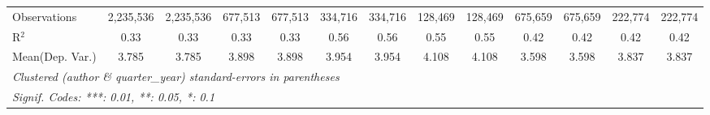 \begin{tabular}{lcccccccccccc}
   Observations                             & 2,235,536    & 2,235,536   & 677,513       & 677,513     & 334,716 & 334,716 & 128,469 & 128,469       & 675,659       & 675,659     & 222,774       & 222,774\\  
   R$^2$                                    & 0.33         & 0.33        & 0.33          & 0.33        & 0.56    & 0.56    & 0.55    & 0.55          & 0.42          & 0.42        & 0.42          & 0.42\\  
Mean(Dep. Var.) & 3.785 & 3.785 & 3.898 & 3.898 & 3.954 & 3.954 & 4.108 & 4.108 & 3.598 & 3.598 & 3.837 & 3.837 \\
   \midrule \midrule
   \multicolumn{13}{l}{\emph{Clustered (author \& quarter\_year) standard-errors in parentheses}}\\
   \multicolumn{13}{l}{\emph{Signif. Codes: ***: 0.01, **: 0.05, *: 0.1}}\\
\end{tabular}
\par\endgroup
